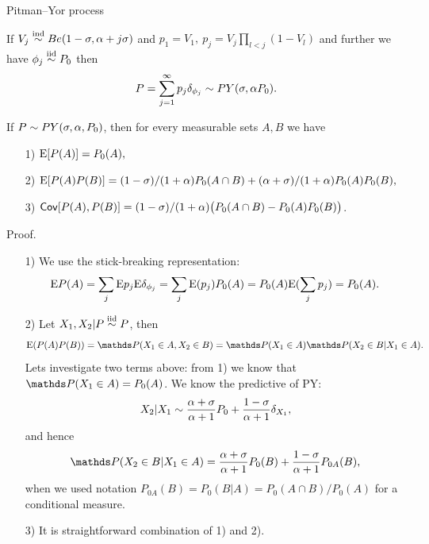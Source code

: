 \begin{frame}[allowframebreaks]{Pitman--Yor process}
\begin{theorem}
If $V_j\stackrel{\mbox{\scriptsize{ind}}}{\sim} Be(1-\sigma, \alpha + j\sigma)$ and $p_1=V_1,\ p_j=V_j\prod_{l<j}(1-V_l)$ and further we have $\phi_j\stackrel{\mbox{\scriptsize{iid}}}{\sim} P_0$ then 
$$
P=\sum_{j=1}^\infty p_j \delta_{\phi_j} \sim PY(\sigma,\alpha P_0).
$$
\end{theorem}

\framebreak


\begin{proposition}
[Moments of PY] If $P\sim PY(\sigma, \alpha, P_0)$, then for every measurable sets $A,B$ we have
\begin{enumerate}
    \item[1)] $\mathrm{E} [P(A)] = P_0(A),$
    \item[2)] $\mathrm{E}[P(A)P(B)]=(1-\sigma)/(1+\alpha)P_0(A\cap B) + (\alpha + \sigma)/(1+ \alpha)P_0(A)P_0(B),$
    \item[3)] $\mathsf{Cov}[P(A),P(B)] = (1-\sigma)/(1+\alpha)\big(P_0(A\cap B) -P_0(A)P_0(B)\big)$.  
\end{enumerate}
\end{proposition}
\framebreak


\alert{Proof.}
\begin{enumerate}
    \item[1)] We use the stick-breaking representation:
    \begin{equation*}
        \mathrm{E} P(A) =\sum_j \mathrm{E} p_j \mathrm{E}\delta_{\phi_j}=\sum_j \mathrm{E}(p_j) P_0(A) = P_0(A)\mathrm{E} (\sum_j p_j)= P_0(A).
    \end{equation*}
    \item[2)] Let $X_1, X_2|P \stackrel{\mbox{\scriptsize{iid}}}{\sim} P$, then
    \begin{equation*}
        \E(P(A)P(B)) = \P(X_1\in A, X_2\in B)=\P(X_1\in A)\P(X_2\in B|X_1\in A).
    \end{equation*}
    Lets investigate two terms above: from 1) we know that $\P(X_1\in A)=P_0(A)$. We know the predictive of PY:
    \begin{equation*}
        X_2|X_1 \sim \frac{\alpha + \sigma}{\alpha + 1}P_0+\frac{1-\sigma}{\alpha + 1}\delta_{X_1},
    \end{equation*}
    and hence
    \begin{equation*}
        \P(X_2\in B|X_1\in A) = \frac{\PrecisionParam + \sigma}{\PrecisionParam + 1}P_0(B) + \frac{1-\sigma}{\PrecisionParam + 1}P_{0A}(B),
    \end{equation*}
    when we used notation $P_{0A}(B)=P_0(B|A)=P_0(A\cap B)/P_0(A)$ for a conditional measure.
    \item[3)] It is straightforward combination of 1) and 2).
\end{enumerate}


\end{frame}
